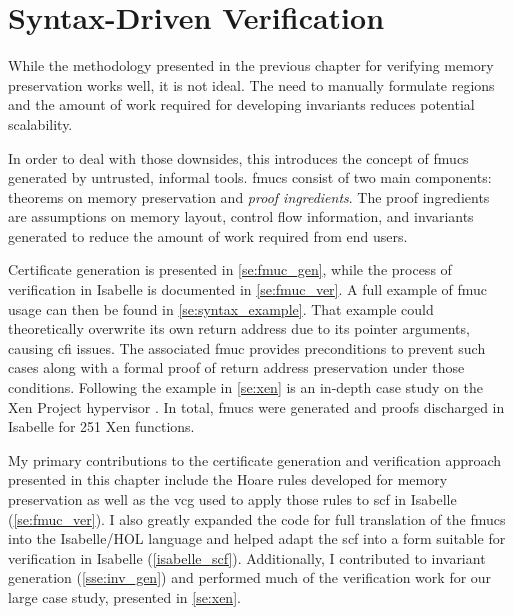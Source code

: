 \chapter{Syntax-Driven Verification}\label{ch:syntax}
While the methodology presented in the previous chapter
for verifying memory preservation works well, it is not ideal.
The need to manually formulate regions
and the amount of work required for developing invariants
reduces potential scalability.

In order to deal with those downsides,
this  introduces the concept of \acp{fmuc}
generated by untrusted, informal tools.
\Acp{fmuc} consist of two main components:
theorems on memory preservation and \emph{proof ingredients}.%
The proof ingredients are assumptions on memory layout,
control flow information, and invariants
generated to reduce the amount of work required from end users.

Certificate generation is presented in \cref{se:fmuc_gen},
while the process of verification in Isabelle is documented in \cref{se:fmuc_ver}.
A full example of \ac{fmuc} usage can then be found in \cref{se:syntax_example}.
That example could theoretically overwrite
its own return address due to its pointer arguments, causing \ac{cfi} issues.
The associated \ac{fmuc} provides preconditions to prevent such cases
along with a formal proof of return address preservation under those conditions.
Following the example in \cref{se:xen} is an in-depth case study
on the Xen Project hypervisor \autocite{chisnall2008definitive}.
In total, \acp{fmuc} were generated and proofs discharged in Isabelle
for 251 Xen functions.

My primary contributions to the certificate generation and verification approach%
presented in this chapter include the Hoare rules developed
for memory preservation as well as the \ac{vcg} used to apply those rules
to \ac{scf} in Isabelle (\cref{se:fmuc_ver}).
I also greatly expanded the code for full translation of the \acp{fmuc}
into the Isabelle/HOL language
and helped adapt the \ac{scf} into a form suitable for verification
in Isabelle (\cref{isabelle_scf}).
Additionally, I contributed to invariant generation (\cref{sse:inv_gen})
and performed much of the verification work for our large case study,
presented in \cref{se:xen}.

